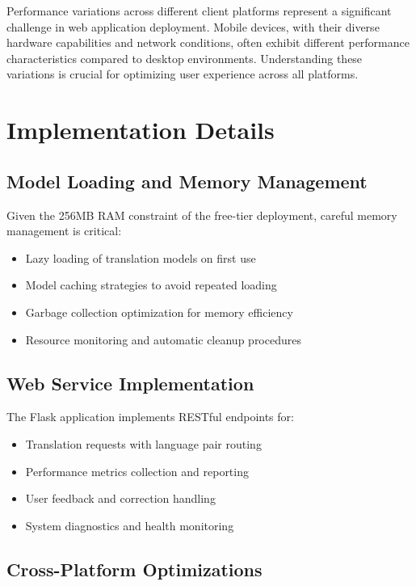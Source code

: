 \documentclass[conference]{IEEEtran}
\begin{document}
Performance variations across different client platforms represent a significant challenge in web application deployment. Mobile devices, with their diverse hardware capabilities and network conditions, often exhibit different performance characteristics compared to desktop environments. Understanding these variations is crucial for optimizing user experience across all platforms.

\section{Implementation Details}

\subsection{Model Loading and Memory Management}

Given the 256MB RAM constraint of the free-tier deployment, careful memory management is critical:

\begin{itemize}
    \item Lazy loading of translation models on first use
    \item Model caching strategies to avoid repeated loading
    \item Garbage collection optimization for memory efficiency
    \item Resource monitoring and automatic cleanup procedures
\end{itemize}

\subsection{Web Service Implementation}

The Flask application implements RESTful endpoints for:
\begin{itemize}
    \item Translation requests with language pair routing
    \item Performance metrics collection and reporting
    \item User feedback and correction handling
    \item System diagnostics and health monitoring
\end{itemize}

\subsection{Cross-Platform Optimizations}
\end{document}

